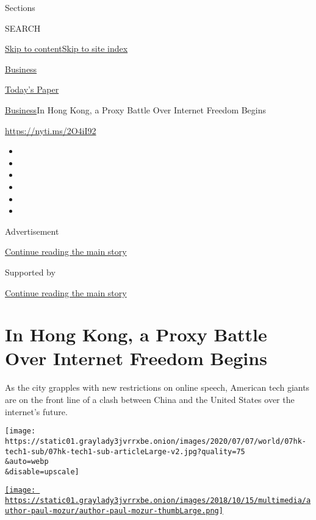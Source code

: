 Sections

SEARCH

\protect\hyperlink{site-content}{Skip to
content}\protect\hyperlink{site-index}{Skip to site index}

\href{https://www.nytimes3xbfgragh.onion/section/business}{Business}

\href{https://myaccount.nytimes3xbfgragh.onion/auth/login?response_type=cookie\&client_id=vi}{}

\href{https://www.nytimes3xbfgragh.onion/section/todayspaper}{Today's
Paper}

\href{/section/business}{Business}\textbar{}In Hong Kong, a Proxy Battle
Over Internet Freedom Begins

\href{https://nyti.ms/2O4iI92}{https://nyti.ms/2O4iI92}

\begin{itemize}
\item
\item
\item
\item
\item
\item
\end{itemize}

Advertisement

\protect\hyperlink{after-top}{Continue reading the main story}

Supported by

\protect\hyperlink{after-sponsor}{Continue reading the main story}

\hypertarget{in-hong-kong-a-proxy-battle-over-internet-freedom-begins}{%
\section{In Hong Kong, a Proxy Battle Over Internet Freedom
Begins}\label{in-hong-kong-a-proxy-battle-over-internet-freedom-begins}}

As the city grapples with new restrictions on online speech, American
tech giants are on the front line of a clash between China and the
United States over the internet's future.

\texttt{[image: https://static01.graylady3jvrrxbe.onion/images/2020/07/07/world/07hk-tech1-sub/07hk-tech1-sub-articleLarge-v2.jpg?quality=75\\\&auto=webp\\\&disable=upscale]}

\href{https://www.nytimes3xbfgragh.onion/by/paul-mozur}{\texttt{[image: https://static01.graylady3jvrrxbe.onion/images/2018/10/15/multimedia/author-paul-mozur/author-paul-mozur-thumbLarge.png]}}

